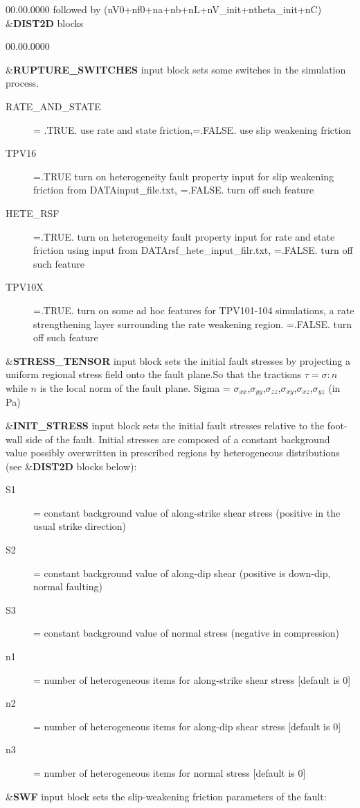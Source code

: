\begin{lyxlist}{00.00.0000}
followed by (nV0+nf0+na+nb+nL+nV\_init+ntheta\_init+nC) \&\textbf{DIST2D} blocks\\

\begin{lyxlist}{00.00.0000}
\item [{\&\textbf{RUPTURE\_SWITCHES}}] input block sets some switches in the simulation process.
  \begin{description}
    \item [{RATE\_AND\_STATE}]
         = .TRUE. use rate and state friction,=.FALSE. use slip weakening friction
    \item [{TPV16}]
         =.TRUE turn on heterogeneity fault property input for slip weakening friction from DATA\/input\_file.txt,
         =.FALSE. turn off such feature
    \item [{HETE\_RSF}]
         =.TRUE. turn on heterogeneity fault property input for rate and state friction
              using input from DATA\/rsf\_hete\_input\_filr.txt,
   =.FALSE. turn off such feature
    \item[{TPV10X}]
         =.TRUE. turn on some ad hoc features for TPV101-104 simulations, a rate strengthening
   layer surrounding the rate weakening region.
   =.FALSE. turn off such feature
   \end{description}


\item [{\&\textbf{STRESS\_TENSOR}}] input block sets the initial fault stresses
  by projecting a uniform regional stress field onto the fault plane.So that the
  tractions $\tau = \sigma : n$ while $n$ is the local norm of the fault plane.
  Sigma =  $\sigma_{xx}$,$\sigma_{yy}$,$\sigma_{zz}$,$\sigma_{xy}$,$\sigma_{xz}$,$\sigma_{yz}$
  (in Pa)




\item [{\&\textbf{INIT\_STRESS}}] input block sets the initial fault stresses
relative to the foot-wall side of the fault. Initial stresses are
composed of a constant background value possibly overwritten in prescribed
regions by heterogeneous distributions (see \&\textbf{DIST2D} blocks
below):

\begin{description}
\item [{S1}] = constant background value of along-strike shear stress (positive
in the usual strike direction)
\item [{S2}] = constant background value of along-dip shear (positive is
down-dip, normal faulting)
\item [{S3}] = constant background value of normal stress (negative in
compression)
\item [{n1}] = number of heterogeneous items for along-strike shear stress
{[}default is 0{]}
\item [{n2}] = number of heterogeneous items for along-dip shear stress
{[}default is 0{]}
\item [{n3}] = number of heterogeneous items for normal stress {[}default
is 0{]}
\end{description}
\item [{\&\textbf{SWF}}] input block sets the slip-weakening friction parameters
of the fault:


\end{lyxlist}
\end{lyxlist}
